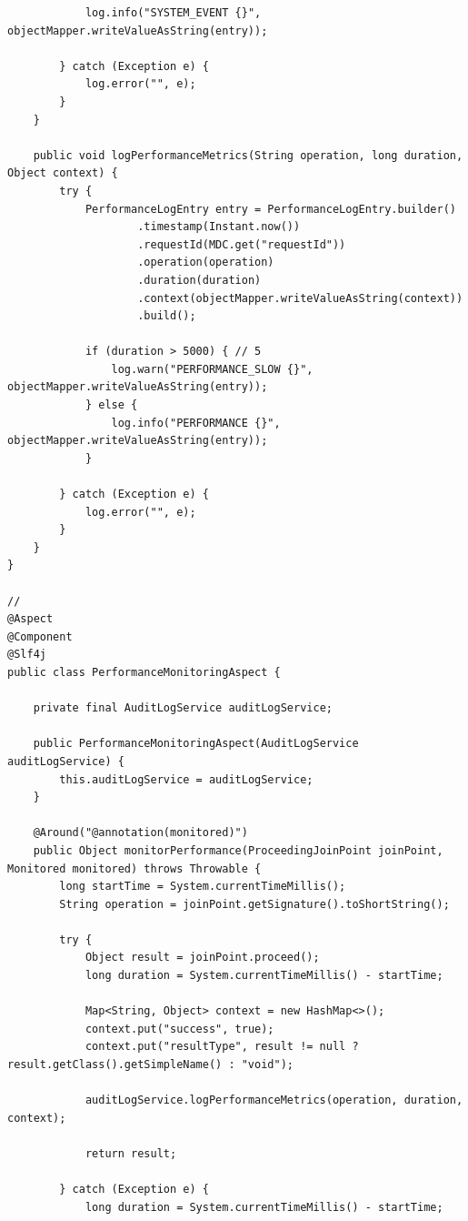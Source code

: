 \begin{verbatim}
            log.info("SYSTEM_EVENT {}", objectMapper.writeValueAsString(entry));
            
        } catch (Exception e) {
            log.error("", e);
        }
    }
    
    public void logPerformanceMetrics(String operation, long duration, Object context) {
        try {
            PerformanceLogEntry entry = PerformanceLogEntry.builder()
                    .timestamp(Instant.now())
                    .requestId(MDC.get("requestId"))
                    .operation(operation)
                    .duration(duration)
                    .context(objectMapper.writeValueAsString(context))
                    .build();
                    
            if (duration > 5000) { // 5
                log.warn("PERFORMANCE_SLOW {}", objectMapper.writeValueAsString(entry));
            } else {
                log.info("PERFORMANCE {}", objectMapper.writeValueAsString(entry));
            }
            
        } catch (Exception e) {
            log.error("", e);
        }
    }
}

// 
@Aspect
@Component
@Slf4j
public class PerformanceMonitoringAspect {
    
    private final AuditLogService auditLogService;
    
    public PerformanceMonitoringAspect(AuditLogService auditLogService) {
        this.auditLogService = auditLogService;
    }
    
    @Around("@annotation(monitored)")
    public Object monitorPerformance(ProceedingJoinPoint joinPoint, Monitored monitored) throws Throwable {
        long startTime = System.currentTimeMillis();
        String operation = joinPoint.getSignature().toShortString();
        
        try {
            Object result = joinPoint.proceed();
            long duration = System.currentTimeMillis() - startTime;
            
            Map<String, Object> context = new HashMap<>();
            context.put("success", true);
            context.put("resultType", result != null ? result.getClass().getSimpleName() : "void");
            
            auditLogService.logPerformanceMetrics(operation, duration, context);
            
            return result;
            
        } catch (Exception e) {
            long duration = System.currentTimeMillis() - startTime;
            

\end{verbatim}
